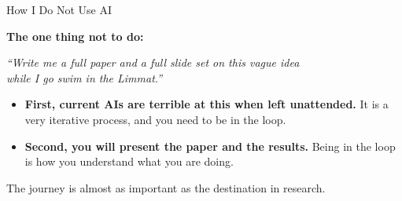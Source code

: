 \documentclass[svgnames,x11names,dvipsnames]{beamer}
\begin{document}
\begin{frame}{How I Do Not Use AI}

\textbf{The one thing not to do:}

\vspace{0.15cm}
\centering
\textit{``Write me a full paper and a full slide set on this vague idea\\ while I go swim in the Limmat.''}

\vspace{0.4cm}
\raggedright

\begin{itemize}
    \setlength{\itemsep}{6pt}
    \item \textbf{First, current AIs are terrible at this when left unattended.} It is a very iterative process, and you need to be in the loop.
    \item \textbf{Second, you will present the paper and the results.} Being in the loop is how you understand what you are doing.
\end{itemize}

\vspace{0.3cm}

\centering
\alert{The journey is almost as important as the destination in research.}

\end{frame}
\end{document}
